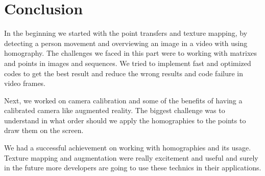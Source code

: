 \section{Conclusion}

In the beginning we started with the point transfers and texture mapping, by detecting a person movement and overviewing an image in a video with using homography. The challenges we faced in this part were to working with matrixes and points in images and sequences. We tried to implement fast and optimized codes to get the best result and reduce the wrong results and code failure in video frames.

Next, we worked on camera calibration and some of the beneﬁts of having a calibrated camera like augmented reality. The biggest challenge was to understand in what order should we apply the homographies to the points to draw them on the screen.

We had a successful achievement on working with homographies and its usage. Texture mapping and augmentation were really excitement and useful and surely in the future more developers are going to use these technics in their applications.
